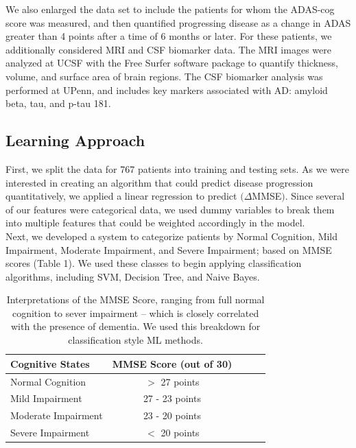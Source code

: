 \documentclass{article}
\begin{document}
We also enlarged the data set to include the %
patients for whom the ADAS-cog score was measured, and then quantified progressing disease as a change in ADAS greater than 4 points after a time of 6 months or later. For these patients, we additionally considered MRI and CSF biomarker data. The MRI images were analyzed at UCSF with the Free Surfer software package to quantify thickness, volume, and surface area of brain regions. The CSF biomarker analysis was performed at UPenn, and includes key markers associated with AD: amyloid beta, tau, and p-tau 181. 


\subsection{Learning Approach} 

First, we split the data for 767 patients into training and testing sets. As we were interested in creating an algorithm that could predict disease progression quantitatively, we applied a linear regression to predict $(\Delta$MMSE$)$. Since several of our features were categorical data, we used dummy variables to break them into multiple features that could be weighted accordingly in the model.\\

Next, we developed a system to categorize patients by Normal Cognition, Mild Impairment, Moderate Impairment, and Severe Impairment; based on MMSE scores (Table 1). We used these classes to begin applying classification algorithms, including SVM, Decision Tree, and Naive Bayes. 

\begin{flushleft}
\begin{table}[h]
\caption{Interpretations of the MMSE Score, ranging from full normal cognition to sever impairment -- which is closely correlated with the presence of dementia. We used this breakdown for classification style ML methods.}
\label{sample-table}
\vskip 0.15in
\begin{center}
\begin{small}
\begin{sc}
\begin{tabular}{lcccr}
\hline
\abovespace
\belowspace
Cognitive States & MMSE Score (out of 30) \\
\hline
\abovespace
\belowspace
Normal Cognition    & $>$ 27 points \\
\belowspace
Mild Impairment & 27 - 23 points  \\
\belowspace
Moderate Impairment    &  23 - 20 points  \\
\belowspace
Severe Impairment     &  $<$ 20 points  \\

\hline
\end{tabular}
\end{sc}
\end{small}
\end{center}
\vskip -0.1in
\end{table}

\end{flushleft}
\end{document}
